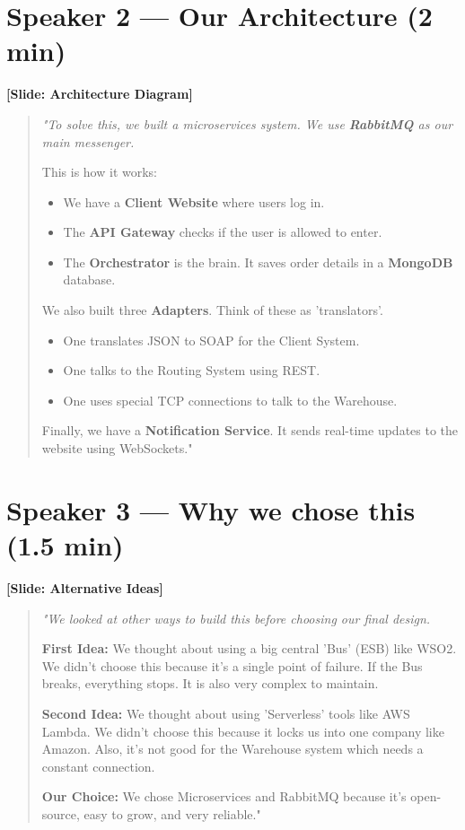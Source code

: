 \documentclass[12pt,a4paper]{article}
\newenvironment{scriptquote}
{\begin{quote}\itshape\color{navy!90}}
{\end{quote}}
\newcommand{\slideinfo}[1]{\noindent\textbf{\color{teal}[#1]}\medskip}
\begin{document}
\section{Speaker 2 --- Our Architecture (2 min)}

\slideinfo{Slide: Architecture Diagram}

\begin{scriptquote}
"To solve this, we built a microservices system. We use \textbf{RabbitMQ} as our main messenger.

This is how it works:

\begin{itemize}
    \item We have a \textbf{Client Website} where users log in.
    \item The \textbf{API Gateway} checks if the user is allowed to enter.
    \item The \textbf{Orchestrator} is the brain. It saves order details in a \textbf{MongoDB} database.
\end{itemize}

We also built three \textbf{Adapters}. Think of these as 'translators'.

\begin{itemize}
    \item One translates JSON to SOAP for the Client System.
    \item One talks to the Routing System using REST.
    \item One uses special TCP connections to talk to the Warehouse.
\end{itemize}

Finally, we have a \textbf{Notification Service}. It sends real-time updates to the website using WebSockets."
\end{scriptquote}

\section{Speaker 3 --- Why we chose this (1.5 min)}

\slideinfo{Slide: Alternative Ideas}

\begin{scriptquote}
"We looked at other ways to build this before choosing our final design.

\textbf{First Idea:} We thought about using a big central 'Bus' (ESB) like WSO2. We didn't choose this because it’s a single point of failure. If the Bus breaks, everything stops. It is also very complex to maintain.

\textbf{Second Idea:} We thought about using 'Serverless' tools like AWS Lambda. We didn't choose this because it locks us into one company like Amazon. Also, it’s not good for the Warehouse system which needs a constant connection.

\textbf{Our Choice:} We chose Microservices and RabbitMQ because it's open-source, easy to grow, and very reliable."
\end{scriptquote}
\end{document}
